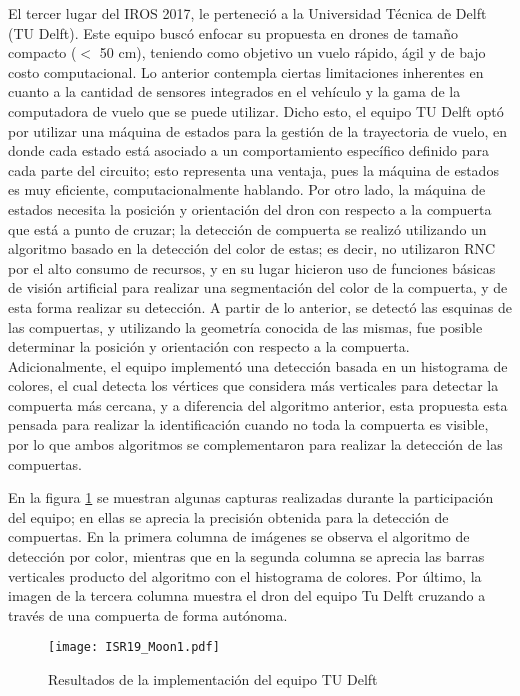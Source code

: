 El tercer lugar del IROS 2017, le perteneció a la Universidad Técnica de Delft (TU Delft). Este equipo buscó enfocar su propuesta en drones de tamaño compacto ($<$ 50 cm), teniendo como objetivo un vuelo rápido, ágil y de bajo costo computacional. Lo anterior contempla ciertas limitaciones inherentes en cuanto a la cantidad de sensores integrados en el vehículo y la gama de la computadora de vuelo que se puede utilizar.
Dicho esto, el equipo TU Delft optó por utilizar una máquina de estados para la gestión de la trayectoria de vuelo, en donde cada estado está asociado a un comportamiento específico definido para cada parte del circuito; esto representa una ventaja, pues la máquina de estados es muy eficiente, computacionalmente hablando. 
Por otro lado, la máquina de estados necesita la posición y orientación del dron con respecto a la compuerta que está a punto de cruzar; la detección de compuerta se realizó utilizando un algoritmo basado en la detección del color de estas; es decir, no utilizaron RNC por el alto consumo de recursos, y en su lugar hicieron uso de funciones básicas de visión artificial para realizar una segmentación del color de la compuerta, y de esta forma realizar su detección. A partir de lo anterior, se detectó las esquinas de las compuertas, y utilizando la geometría conocida de las mismas, fue posible determinar la posición y orientación con respecto a la compuerta. Adicionalmente, el equipo implementó una detección basada en un histograma de colores, el cual detecta los vértices que considera más verticales para detectar la compuerta más cercana, y a diferencia del algoritmo anterior, esta propuesta esta pensada para realizar la identificación cuando no toda la compuerta es visible, por lo que ambos algoritmos se complementaron para realizar la detección de las compuertas. 

En la figura \ref{fig:ISR19_Moon1} se muestran algunas capturas realizadas durante la participación del equipo; en ellas se aprecia la precisión obtenida para la detección de compuertas. En la primera columna de imágenes se observa el algoritmo de detección por color, mientras que en la segunda columna se aprecia las barras verticales producto del algoritmo con el histograma de colores. Por último, la imagen de la tercera columna muestra el dron del equipo Tu Delft cruzando a través de una compuerta de forma autónoma.

\begin{figure}[ht]
    \centering
    \texttt{[image: ISR19\_Moon1.pdf]}
    \caption{Resultados de la implementación del equipo TU Delft \citet{moon2019challenges}}
    \label{fig:ISR19_Moon1}
\end{figure}

